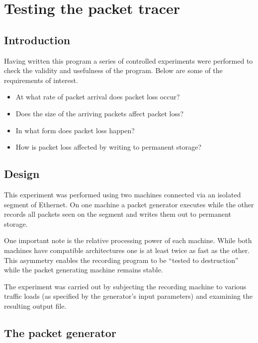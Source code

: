 \section{Testing the packet tracer}

\subsection{Introduction}

Having written this program a series of controlled experiments were
performed to check the validity and usefulness of the program.  Below
are some of the requirements of interest.

\begin{itemize}
\item	At what rate of packet arrival does packet loss occur?

\item	Does the size of the arriving packets affect packet loss?

\item	In what form does packet loss happen?

\item	How is packet loss affected by writing to permanent storage?
\end{itemize}

\subsection{Design}

This experiment was performed using two machines connected via an
isolated segment of Ethernet.  On one machine a packet generator
executes while the other records all packets seen on the segment and
writes them out to permanent storage.

One important note is the relative processing power of each machine.
While both machines have compatible architectures one is at least
twice as fast as the other.  This asymmetry enables the recording
program to be ``tested to destruction'' while the packet generating
machine remains stable.

The experiment was carried out by subjecting the recording machine to
various traffic loads (as specified by the generator's input
parameters) and examining the resulting output file.

\subsection{The packet generator}

